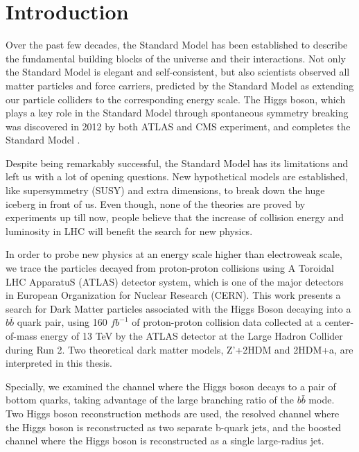 \chapter{Introduction}

\label{ch:intro}
\par Over the past few decades, the Standard Model has been established to describe the fundamental building blocks of the universe and their interactions.
 Not only the Standard Model is elegant and self-consistent, but also scientists observed all matter particles and force carriers, predicted by the Standard Model as extending our particle colliders to the corresponding energy scale.
The Higgs boson, which plays a key role in the Standard Model through spontaneous symmetry breaking was discovered in 2012 by both ATLAS and CMS experiment, 
and completes the Standard Model\cite{Aad:2012tfa} \cite{Chatrchyan:2012xdj}.

\par Despite being remarkably successful, the Standard Model has its limitations and left us with a lot of opening questions. 
New hypothetical models are established, like supersymmetry (SUSY) and extra dimensions,
to break down the huge iceberg in front of us. Even though, none of the theories are proved by experiments up till now, 
people believe that the increase of collision energy and luminosity in LHC will benefit the search for new physics.

\par In order to probe new physics at an energy scale higher than electroweak scale,
 we trace the particles decayed from proton-proton collisions using A Toroidal LHC ApparatuS (ATLAS) detector system,
 which is one of the major detectors in European Organization for Nuclear Research (CERN). This work presents a search for Dark Matter particles associated
with the Higgs Boson decaying into a $b\bar{b}$ quark pair, using 160 $fb^{-1}$ of proton-proton collision data collected at a center-of-mass energy of 13 TeV
by the ATLAS detector at the Large Hadron Collider during Run 2. Two theoretical dark matter models, Z'+2HDM and 
2HDM+a, are interpreted in this thesis.

\par Specially, we examined the channel where the Higgs boson decays to a pair of bottom quarks, taking advantage of the large branching ratio of the $b\bar{b}$ mode. 
Two Higgs boson reconstruction methods are used, the resolved channel where the Higgs boson is reconstructed as two separate b-quark jets, 
and the boosted channel where the Higgs boson is reconstructed as a single large-radius jet.

